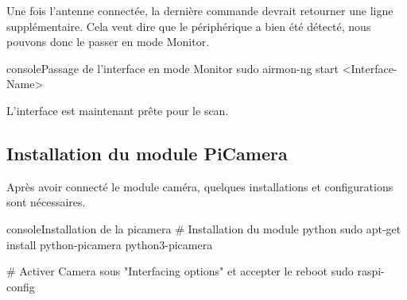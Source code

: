 Une fois l'antenne connectée, la dernière commande devrait retourner une ligne supplémentaire. 
Cela veut dire que le périphérique a bien été détecté, nous pouvons donc le passer en mode Monitor.

\begin{listingsbox}{console}{Passage de l'interface en mode Monitor}
sudo airmon-ng start <Interface-Name>
\end{listingsbox}

L'interface est maintenant prête pour le scan.

\subsection{Installation du module PiCamera}
Après avoir connecté le module caméra, quelques installations et configurations sont nécessaires.

\begin{listingsbox}{console}{Installation de la picamera}
    # Installation du module python
    sudo apt-get install python-picamera python3-picamera

    # Activer Camera sous "Interfacing options" et accepter le reboot
    sudo raspi-config 
\end{listingsbox}

